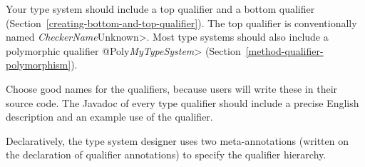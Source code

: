 
Your type system should include a top qualifier and a bottom qualifier
(Section~\ref{creating-bottom-and-top-qualifier}).
The top qualifier is conventionally named \<\emph{CheckerName}Unknown>.
Most type systems should also include a
polymorphic qualifier \<@Poly\emph{MyTypeSystem}>
(Section~\ref{method-qualifier-polymorphism}).

Choose good names for the qualifiers, because users will write these in
their source code.
The Javadoc of every type qualifier should include a precise English
description and an example use of the qualifier.



Declaratively, the type system designer uses two meta-annotations (written
on the declaration of qualifier annotations) to specify the qualifier
hierarchy.

